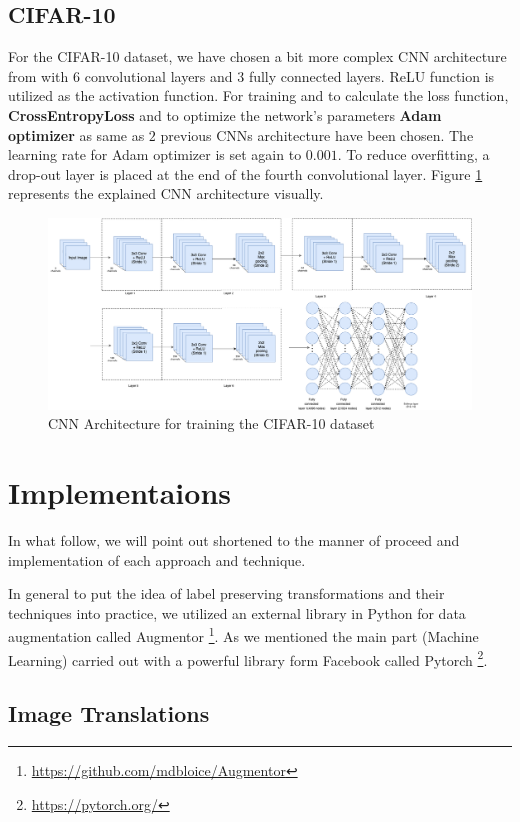 \subsection{CIFAR-10}
For the CIFAR-10 dataset, we have chosen a bit more complex CNN architecture from \cite{CIFAR_CNN_Architecture} with $6$
convolutional layers and $3$ fully connected layers. ReLU function is utilized as the activation
function. For training and to calculate the loss function, \textbf{CrossEntropyLoss} and
to optimize the network's parameters \textbf{Adam optimizer} as same as $2$ previous CNNs architecture have been
chosen. The learning rate for Adam optimizer is set again to $0.001$. To reduce overfitting, a
drop-out layer is placed at the end of the fourth convolutional layer. Figure \ref{fig:CIFAR_CNN_Architecture} represents the explained CNN architecture visually.


\begin{figure}
  \centering
  \label{fig:CIFAR_CNN_Architecture}
  \includegraphics[width=1\textwidth]{fig/CIFAR-CNN-Architecture}
  \caption{CNN Architecture for training the CIFAR-10 dataset}
\end{figure}

\section{Implementaions}
In what follow, we will point out shortened to the manner of proceed and implementation of each
approach and technique.

In general to put the idea of label preserving transformations and their techniques
into practice, we utilized an external library in Python for data augmentation called Augmentor \footnote{\url{https://github.com/mdbloice/Augmentor}}. As
we mentioned the main part (Machine Learning) carried out with a powerful library form Facebook
called Pytorch \footnote{\url{https://pytorch.org/}}.

\subsection{Image Translations}
